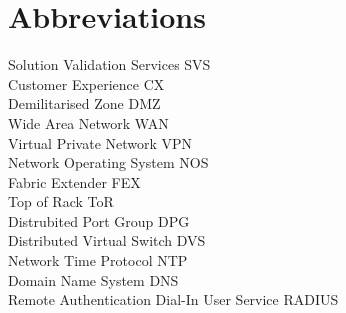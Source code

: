 \section*{Abbreviations}
\large 
Solution Validation Services \hfill SVS\\
Customer Experience \hfill CX\\
Demilitarised Zone \hfill DMZ\\
Wide Area Network \hfill WAN\\
Virtual Private Network \hfill VPN\\
Network Operating System \hfill NOS\\
Fabric Extender \hfill FEX\\
Top of Rack \hfill ToR\\
Distrubited Port Group \hfill DPG\\
Distributed Virtual Switch \hfill DVS\\
Network Time Protocol \hfill NTP\\
Domain Name System \hfill DNS\\
Remote Authentication Dial-In User Service \hfill RADIUS\\

